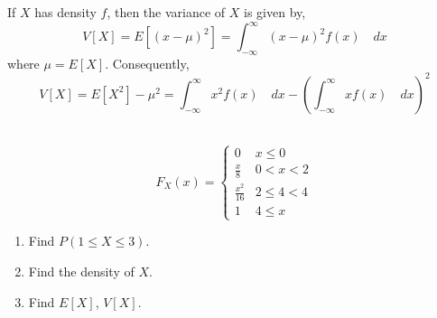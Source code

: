 \begin{definition}
If $X$ has density $f$,  then the variance of $X$ is given by, 
\[
    V[X] = E[(x - \mu)^2]
         = \int_{-\infty}^{\infty} (x - \mu)^2 f(x) \quad dx
\]
where $\mu = E[X]$. Consequently,
\[
    V[X] = E[X^2] - \mu^2
         = \int_{-\infty}^{\infty} x^2 f(x) \quad dx -
           \left( \int_{-\infty}^{\infty} x f(x) \quad dx \right)^2
\]
\end{definition}

\begin{example} \quad                                                        \\
\[
    F_X(x) = \begin{cases}
        0                    & x \leq 0                                      \\
        \frac{x}{8}          & 0 < x < 2                                     \\
        \frac{x^2}{16}       & 2 \leq 4 < 4                                  \\
        1                    & 4 \leq x 
    \end{cases}
\]
\begin{enumerate}[noitemsep, topsep=0em]
\item Find $P(1 \leq X \leq 3)$.
\item Find the density of $X$.
\item Find $E[X]$, $V[X]$.
\end{enumerate}
\end{example}
